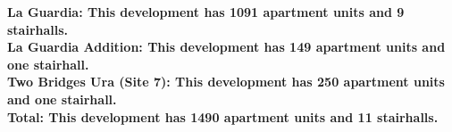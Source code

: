 \bf{La Guardia}: This development has 1091 apartment units and 9 stairhalls.\\\bf{La Guardia Addition}: This development has 149 apartment units and one stairhall.\\\bf{Two Bridges Ura (Site 7)}: This development has 250 apartment units and one stairhall.\\\bf{Total}: This development has 1490 apartment units and 11 stairhalls.\\